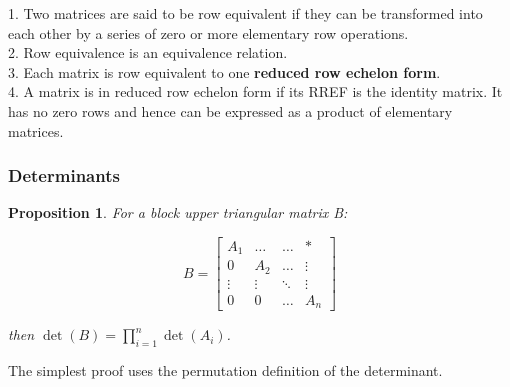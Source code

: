 \documentclass[12pt]{article}
\newtheorem{proposition}{Proposition}
\begin{document}
1. Two matrices are said to be row equivalent if they can be transformed into each other by a series of zero or more elementary row operations.\\
2. Row equivalence is an equivalence relation.\\
3. Each matrix is row equivalent to one \textbf{reduced row echelon form}.\\
4. A matrix is in reduced row echelon form if its RREF is the identity matrix. It has no zero rows and hence can be expressed as a product of elementary matrices.

\subsubsection{Determinants}

\begin{proposition}
For a block upper triangular matrix B:

\[
B = \begin{bmatrix}
A_1 & \ldots & \ldots & * \\
0 & A_2 & \ldots & \vdots \\
\vdots & \vdots & \ddots & \vdots \\
0 & 0 & \ldots & A_n
\end{bmatrix}
\]

then \( \det(B) = \prod_{i=1}^{n} \det(A_i) \).
\end{proposition}

The simplest proof uses the permutation definition of the determinant.
\end{document}
